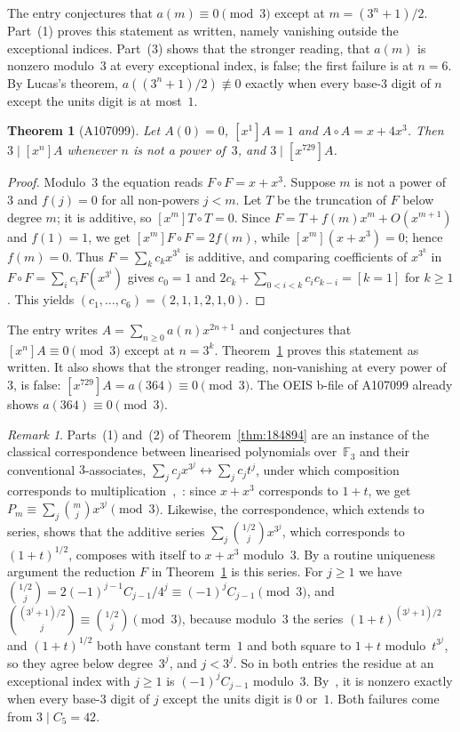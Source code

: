 \documentclass[11pt]{article}
\newtheorem{theorem}{Theorem}
\theoremstyle{remark}
\newtheorem*{remark*}{Remark}
\newcommand{\F}{\mathbb F}
\newcommand{\dsarxiv}{arXiv:\allowbreak math/\allowbreak0407326v1}
\begin{document}
The entry conjectures that $a(m)\equiv0\pmod3$ except at $m=(3^n+1)/2$.
Part~(1) proves this statement as written, namely vanishing outside the
exceptional indices. Part~(3) shows that the stronger reading, that $a(m)$ is
nonzero modulo~$3$ at every exceptional index, is false; the first failure is
at $n=6$. By Lucas's theorem, $a((3^n+1)/2)\not\equiv0$
exactly when every base-$3$ digit of $n$ except the units digit is at most~$1$.

\begin{theorem}[A107099]\label{thm:107099}
Let $A(0)=0$, $[x^1]A=1$ and $A\circ A=x+4x^3$. Then $3\mid[x^n]A$ whenever
$n$ is not a power of~$3$, and $3\mid[x^{729}]A$.
\end{theorem}
\begin{proof}
Modulo~$3$ the equation reads $F\circ F=x+x^3$. Suppose $m$ is not a power
of~$3$ and $f(j)=0$ for all non-powers $j<m$. Let $T$ be the truncation of
$F$ below degree $m$; it is additive, so $[x^m]T\circ T=0$. Since
$F=T+f(m)x^m+O(x^{m+1})$ and $f(1)=1$, we get $[x^m]F\circ F=2f(m)$, while
$[x^m](x+x^3)=0$; hence $f(m)=0$. Thus $F=\sum_kc_kx^{3^k}$ is additive, and
comparing coefficients of $x^{3^k}$ in $F\circ F=\sum_ic_iF(x^{3^i})$ gives
$c_0=1$ and $2c_k+\sum_{0<i<k}c_ic_{k-i}=[k=1]$ for $k\ge1$. This yields
$(c_1,\dots,c_6)=(2,1,1,2,1,0)$.
\end{proof}

The entry writes $A=\sum_{n\ge0}a(n)x^{2n+1}$ and conjectures that
$[x^n]A\equiv0\pmod3$ except at $n=3^k$. Theorem~\ref{thm:107099} proves this
statement as written. It also shows that the stronger reading, non-vanishing
at every power of~$3$, is false: $[x^{729}]A=a(364)\equiv0\pmod3$. The OEIS
b-file of A107099 already shows $a(364)\equiv0\pmod3$.

\begin{remark*}
Parts~(1) and~(2) of Theorem~\ref{thm:184894} are an instance of the
classical correspondence between linearised polynomials over~$\F_3$ and
their conventional $3$-associates, $\sum_jc_jx^{3^j}\leftrightarrow
\sum_jc_jt^j$, under which composition corresponds to
multiplication~\cite{ore},~\cite[Lemma~3.59]{ln}: since $x+x^3$ corresponds
to $1+t$, we get $P_m\equiv\sum_j\binom mjx^{3^j}\pmod3$. Likewise, the
correspondence, which extends to series, shows that the additive series
$\sum_j\binom{1/2}{j}x^{3^j}$, which corresponds to $(1+t)^{1/2}$, composes
with itself to $x+x^3$ modulo~$3$. By a routine uniqueness argument the
reduction $F$ in Theorem~\ref{thm:107099} is this series. For $j\ge1$ we have
$\binom{1/2}{j}=2(-1)^{j-1}C_{j-1}/4^j\equiv(-1)^jC_{j-1}\pmod3$, and
$\binom{(3^j+1)/2}{j}\equiv\binom{1/2}{j}\pmod3$, because modulo~$3$ the series
$(1+t)^{(3^j+1)/2}$ and $(1+t)^{1/2}$ both have constant term~$1$ and both square
to $1+t$ modulo~$t^{3^j}$, so they agree below degree~$3^j$, and $j<3^j$. So in both entries the residue at
an exceptional index with $j\ge1$ is $(-1)^jC_{j-1}$ modulo~$3$.
By~\cite[Theorem~5.2 in \dsarxiv]{ds}, it is nonzero exactly when every
base-$3$ digit of $j$ except the units digit is $0$ or~$1$. Both failures come from
$3\mid C_5=42$.
\end{remark*}
\end{document}
